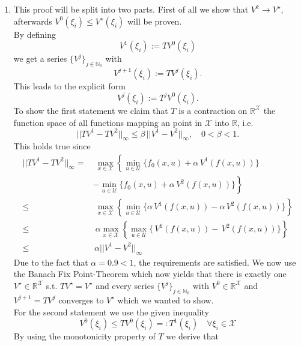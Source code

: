 \documentclass[12pt,pdftex,a4paper]{scrartcl}
\newcommand{\set}[1]{\mathbb{#1}}
\begin{document}
\begin{enumerate}
	\item This proof will be split into two parts. First of all we show that $V^k \rightarrow V^\star$, afterwards $V^0(\xi_i) \le V^\star(\xi_i)$ will be proven. \\
	By defining 
	\begin{equation*}
		V^1(\xi_i) := TV^0(\xi_i)
	\end{equation*}
	we get a series $\{V^j\}_{j\in \set{N}_0}$ with
	\begin{equation*}
		V^{j+1}(\xi_i) := TV^j(\xi_i).
	\end{equation*}
	This leads to the explicit form
	\begin{equation*}
		V^j(\xi_i) := T^jV^0(\xi_i).
	\end{equation*}
	To show the first statement we claim that $T$ is a contraction on $\set{R}^\mathcal{X}$ the function space of all functions mapping an point in $\mathcal{X}$ into $\set{R}$, i.e.
	\begin{equation*}
		||TV^1 - TV^2||_\infty \le \beta\,||V^1 - V^2||_\infty, \quad 0 < \beta < 1.
	\end{equation*}
	This holds true since
	\begin{align*}
		||TV^1 - TV^2||_\infty = & \;\max_{x\in\mathcal{X}}\left\{ \min_{u\in\mathcal{U}}\{ f_0(x,u) + \alpha\,V^1(f(x,u))\} \right. \\
		& \left. - \min_{u\in\mathcal{U}}\{ f_0(x,u) + \alpha\,V^2(f(x,u))\}\right\} \\
		\le & \;\max_{x\in\mathcal{X}}\left\{ \min_{u\in\mathcal{U}}\{ \alpha\,V^1(f(x,u)) - \alpha\,V^2(f(x,u))\}\right\} \\
		\le & \;\alpha \max_{x\in\mathcal{X}}\left\{ \max_{u\in\mathcal{U}}\{ \,V^1(f(x,u)) -\,V^2(f(x,u))\}\right\} \\
		\le & \,\alpha ||V^1 - V^2||_\infty
	\end{align*}
	Due to the fact that $\alpha = 0.9 < 1$, the requirements are satisfied. We now use the Banach Fix Point-Theorem which now yields that there is exactly one $V^\star \in \set{R}^\mathcal{X}$ s.t. $TV^\star = V^\star$ and every series $\{V^j\}_{j\in \set{N}_0}$ with $V^0 \in \set{R}^\mathcal{X}$ and $V^{j+1} = TV^j$ converges to $V^\star$ which we wanted to show.\\
	For the second statement we use the given inequality
	\begin{equation*}
		V^0(\xi_i) \le TV^0(\xi_i) =: T^1(\xi_i) \quad \forall\xi_i\in\mathcal{X}
	\end{equation*}
	By using the monotonicity property of $T$ we derive that

\end{enumerate}
\end{document}
